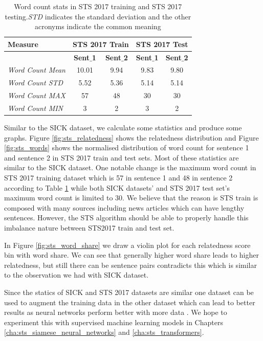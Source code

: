 \begin{enumerate}
\begin{table}
	\centering
	\begin{tabular}{l|cc|cc}
		\hline
		Measure   & \multicolumn{2}{c|}{STS 2017 Train} & \multicolumn{2}{c}{STS 2017 Test} \\
		\hline
		\multicolumn{1}{l|}{} & \textbf{Sent$\_$1} & \textbf{Sent$\_$2} & \textbf{Sent$\_$1} & \textbf{Sent$\_$2} \\
		\textit{Word Count Mean} & 10.01 & 9.94 & 9.83 & 9.80  \\
		\textit{Word Count STD} & 5.52 & 5.36 & 5.14 & 5.14  \\
		\textit{Word Count MAX} & 57 & 48 & 30 & 30  \\
		\textit{Word Count MIN} & 3 & 2 & 3 & 2  \\
		\hline
	\end{tabular}
	\caption[Word count stats in STS 2017]{Word count stats in STS 2017 training and STS 2017 testing.\textit{STD} indicates the standard deviation and the other acronyms indicate the common meaning }
	\label{table:sts_2017_sts}
\end{table}

Similar to the SICK dataset, we calculate some statistics and produce some graphs. Figure \ref{fig:sts_relatedness} shows the relatedness distribution and Figure \ref{fig:sts_words} shows the normalised distribution of word count for sentence 1 and sentence 2 in STS 2017 train and test sets. Most of these statistics are similar to the SICK dataset. One notable change is the maximum word count in STS 2017 training dataset which is 57 in sentence 1 and 48 in sentence 2 according to Table \ref{table:sts_2017_sts} while both SICK datasets' and STS 2017 test set's maximum word count is limited to 30. We believe that the reason is STS train is composed with many sources including news articles which can have lengthy sentences. However, the STS algorithm should be able to properly handle this imbalance nature between STS2017 train and test set. 

In Figure \ref{fig:sts_word_share} we draw a violin plot for each relatedness score bin with word share. We can see that generally higher word share leads to higher relatedness, but still there can be sentence pairs contradicts this which is similar to the observation we had with SICK dataset. 

Since the statics of SICK and STS 2017 datasets are similar one dataset can be used to augment the training data in the other dataset which can lead to better results as neural networks perform better with more data \cite{wang-etal-2020-evaluating,info:doi/10.2196/23086}. We hope to experiment this with supervised machine learning models in Chapters \ref{cha:sts_siamese_neural_networks} and \ref{cha:sts_transformers}.
  

\end{enumerate}
